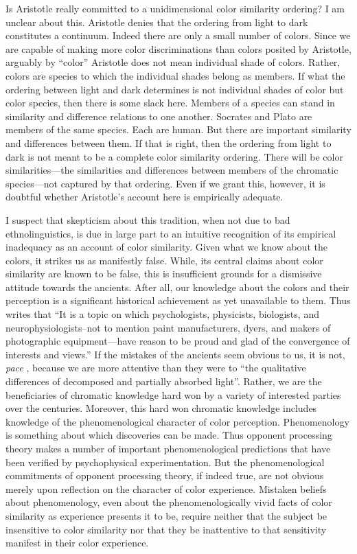 Is Aristotle really committed to a unidimensional color similarity ordering? I am unclear about this. Aristotle denies that the ordering from light to dark constitutes a continuum. Indeed there are only a small number of colors. Since we are capable of making more color discriminations than colors posited by Aristotle, arguably by ``color'' Aristotle does not mean individual shade of colors. Rather, colors are species to which the individual shades belong as members. If what the ordering between light and dark determines is not individual shades of color but color species, then there is some slack here. Members of a species can stand in similarity and difference relations to one another. Socrates and Plato are members of the same species. Each are human. But there are important similarity and differences between them. If that is right, then the ordering from light to dark is not meant to be a complete color similarity ordering. There will be color similarities---the similarities and differences between members of the chromatic species---not captured by that ordering. Even if we grant this, however, it is doubtful whether Aristotle's account here is empirically adequate.

I suspect that skepticism about this tradition, when not due to bad ethnolinguistics, is due in large part to an intuitive recognition of its empirical inadequacy as an account of color similarity. Given what we know about the colors, it strikes us as manifestly false. While, its central claims about color similarity are known to be false, this is insufficient grounds for a dismissive attitude towards the ancients. After all, our knowledge about the colors and their perception is a significant historical achievement as yet unavailable to them. Thus \citet[291]{Broackes:2010uq} writes that ``It is a topic on which psychologists, physicists, biologists, and neurophysiologists--not to mention paint manufacturers, dyers, and makers of photographic equipment---have reason to be proud and glad of the convergence of interests and views.'' If the mistakes of the ancients seem obvious to us, it is not, \emph{pace} \citet[162]{Platnauer:1921bh}, because we are more attentive than they were to ``the qualitative differences of decomposed and partially absorbed light''. Rather, we are the beneficiaries of chromatic knowledge hard won by a variety of interested parties over the centuries. Moreover, this hard won chromatic knowledge includes knowledge of the phenomenological character of color perception. Phenomenology is something about which discoveries can be made. Thus opponent processing theory makes a number of important phenomenological predictions that have been verified by psychophysical experimentation. But the phenomenological commitments of opponent processing theory, if indeed true, are not obvious merely upon reflection on the character of color experience. Mistaken beliefs about phenomenology, even about the phenomenologically vivid facts of color similarity as experience presents it to be, require neither that the subject be insensitive to color similarity nor that they be inattentive to that sensitivity manifest in their color experience. 

